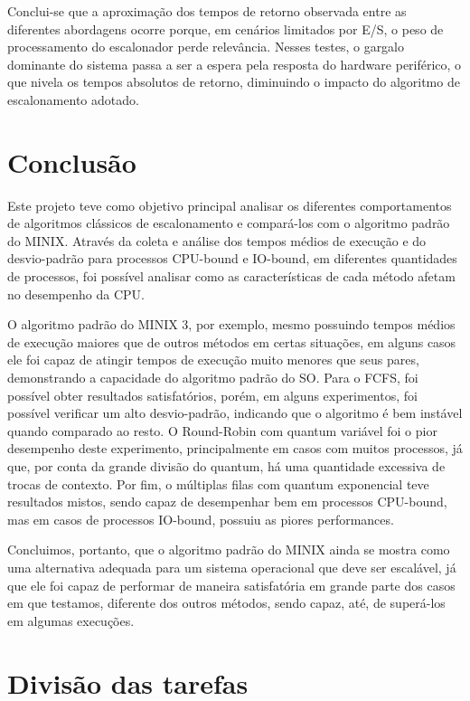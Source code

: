 \documentclass[12pt]{article}
\begin{document}
Conclui-se que a aproximação dos tempos de retorno observada entre as diferentes abordagens ocorre porque, em cenários limitados por E/S, o peso de processamento do escalonador perde relevância. Nesses testes, o gargalo dominante do sistema passa a ser a espera pela resposta do hardware periférico, o que nivela os tempos absolutos de retorno, diminuindo o impacto do algoritmo de escalonamento adotado.

\section{Conclusão}
Este projeto teve como objetivo principal analisar os diferentes comportamentos de algoritmos clássicos de escalonamento e compará-los 
com o algoritmo padrão do MINIX. Através da coleta e análise dos tempos médios de execução e do desvio-padrão para processos CPU-bound e IO-bound,
em diferentes quantidades de processos, foi possível analisar como as características de cada método afetam no desempenho da CPU.

O algoritmo padrão do MINIX 3, por exemplo, mesmo possuindo tempos médios de execução maiores que de outros métodos em certas situações, 
em alguns casos ele foi capaz de atingir tempos de execução muito menores que seus pares, demonstrando a capacidade do algoritmo padrão do SO. Para o FCFS, foi possível obter resultados satisfatórios, porém, em alguns experimentos, foi possível verificar um alto desvio-padrão, indicando que o algoritmo é bem instável quando comparado ao resto. O Round-Robin com quantum variável foi o pior desempenho deste experimento, principalmente em casos com muitos processos, já que, por conta da grande divisão do quantum, há uma quantidade excessiva de trocas de contexto. Por fim, o múltiplas filas com quantum exponencial teve resultados mistos, sendo capaz de desempenhar bem em processos CPU-bound, mas em casos de processos IO-bound, possuiu as piores performances.

Concluimos, portanto, que o algoritmo padrão do MINIX ainda se mostra como uma alternativa adequada para um sistema operacional que deve ser escalável, já que ele foi capaz de performar de maneira satisfatória em grande parte dos casos em que testamos, diferente dos outros métodos, sendo capaz, até, de superá-los em algumas execuções. 


\section{Divisão das tarefas}
\end{document}
